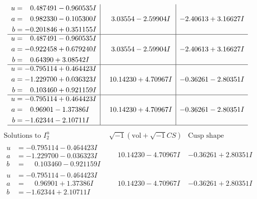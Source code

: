 \documentclass[1p]{elsarticle_modified}
\theoremstyle{definition}
\newcommand{\I}{\sqrt{-1}}
\begin{document}
$$\begin{array}{c|c|c}
\begin{aligned}
u &= \phantom{-}0.487491 - 0.960535 I \\
a &= \phantom{-}0.982330 - 0.105300 I \\
b &= -0.201846 + 0.351155 I\end{aligned}
 & \phantom{-}3.03554 - 2.59904 I & -2.40613 + 3.16627 I \\ \hline\begin{aligned}
u &= \phantom{-}0.487491 - 0.960535 I \\
a &= -0.922458 + 0.679240 I \\
b &= \phantom{-}0.64390 + 3.08542 I\end{aligned}
 & \phantom{-}3.03554 - 2.59904 I & -2.40613 + 3.16627 I \\ \hline\begin{aligned}
u &= -0.795114 + 0.464423 I \\
a &= -1.229700 + 0.036323 I \\
b &= \phantom{-}0.103460 + 0.921159 I\end{aligned}
 & \phantom{-}10.14230 + 4.70967 I & -0.36261 - 2.80351 I \\ \hline\begin{aligned}
u &= -0.795114 + 0.464423 I \\
a &= \phantom{-}0.96901 - 1.37386 I \\
b &= -1.62344 - 2.10711 I\end{aligned}
 & \phantom{-}10.14230 + 4.70967 I & -0.36261 - 2.80351 I\\
 \hline 
 \end{array}$$\newpage$$\begin{array}{c|c|c}  
\text{Solutions to }I^u_{2}& \I (\text{vol} + \sqrt{-1}CS) & \text{Cusp shape}\\
 \hline 
\begin{aligned}
u &= -0.795114 - 0.464423 I \\
a &= -1.229700 - 0.036323 I \\
b &= \phantom{-}0.103460 - 0.921159 I\end{aligned}
 & \phantom{-}10.14230 - 4.70967 I & -0.36261 + 2.80351 I \\ \hline\begin{aligned}
u &= -0.795114 - 0.464423 I \\
a &= \phantom{-}0.96901 + 1.37386 I \\
b &= -1.62344 + 2.10711 I\end{aligned}
 & \phantom{-}10.14230 - 4.70967 I & -0.36261 + 2.80351 I \\ \hline\begin{aligned}

\end{aligned}
\end{array}$$
\end{document}
